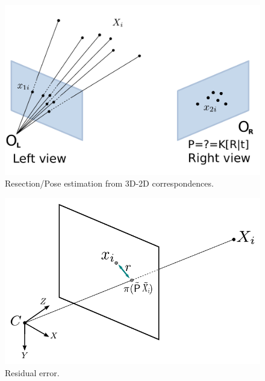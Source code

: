\documentclass[11pt, letterpaper]{report}
\begin{document}
\begin{figure}[h!]
\begin{center}
\includegraphics[scale=.6]{figures/resection_geometry}
\caption{Resection/Pose estimation from 3D-2D correspondences.}
\label{resection_fig}
\end{center}
\end{figure}

\begin{figure}[h!]
\begin{center}
\includegraphics[scale=.4]{figures/residual_error}
\caption{Residual error.}
\label{residual_fig}
\end{center}
\end{figure}

\newpage
\end{document}
